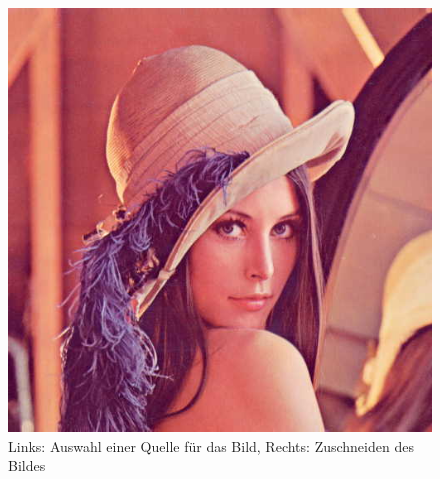 \documentclass[../main.tex]{subfiles}
\begin{document}
\begin{figure} 
	\centering
	\includegraphics[width=0.45\textwidth*2, height=0.45\textwidth/9*16]{./images/lena.jpg}
	\caption{Links: Auswahl einer Quelle für das Bild, Rechts: Zuschneiden des Bildes}
	\label{choose_crop}
\end{figure}
\end{document}
